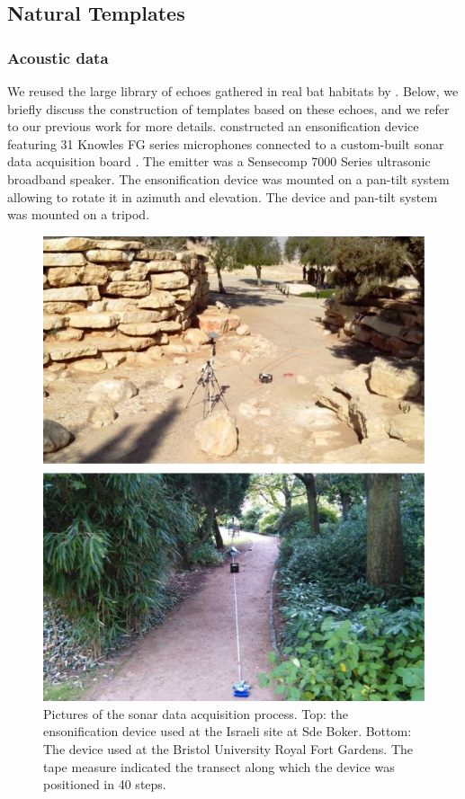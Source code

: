 \documentclass[preprint,5p]{elsarticle}
\begin{document}
\subsection{Natural Templates}

\subsubsection{Acoustic data}

We reused the large library of echoes gathered in real bat habitats by \citet{Vanderelst2016}. Below, we briefly discuss the construction of templates based on these echoes, and we refer to our previous work for more details. \citet{Vanderelst2016} constructed an ensonification device featuring 31 Knowles FG series microphones connected to a custom-built sonar data acquisition board \citep{Steckel2013a}. The emitter was a Sensecomp 7000 Series ultrasonic broadband speaker. The ensonification device was mounted on a pan-tilt system allowing to rotate it in azimuth and elevation. The device and pan-tilt system was mounted on a tripod.

\begin{figure}[tb]
	\centering
	\includegraphics[width=1\linewidth]{figures/datacollection}
	\caption{Pictures of the sonar data acquisition process. Top: the ensonification device used at the Israeli site at Sde Boker. Bottom: The device used at the Bristol University Royal Fort Gardens. The tape measure indicated the transect along which the device was positioned in 40 steps.}
	\label{fig:datacollection}
\end{figure}
\end{document}
